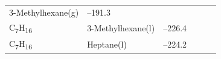 \documentclass[
]{book}
\theoremstyle{definition}
\theoremstyle{definition}
\theoremstyle{definition}
\theoremstyle{remark}
\begin{document}
\begin{longtable}[]{@{}llllll@{}}
\begin{minipage}[t]{0.17\columnwidth}
3-Methylhexane(g)\strut
\end{minipage} & \begin{minipage}[t]{0.15\columnwidth}\raggedright
--191.3\strut
\end{minipage} & \begin{minipage}[t]{0.15\columnwidth}\raggedright
\strut
\end{minipage} & \begin{minipage}[t]{0.14\columnwidth}\raggedright
\strut
\end{minipage} & \begin{minipage}[t]{0.14\columnwidth}\raggedright
\strut
\end{minipage}\tabularnewline
\begin{minipage}[t]{0.07\columnwidth}\raggedright
C\textsubscript{7}H\textsubscript{16}\strut
\end{minipage} & \begin{minipage}[t]{0.17\columnwidth}\raggedright
3-Methylhexane(l)\strut
\end{minipage} & \begin{minipage}[t]{0.15\columnwidth}\raggedright
--226.4\strut
\end{minipage} & \begin{minipage}[t]{0.15\columnwidth}\raggedright
\strut
\end{minipage} & \begin{minipage}[t]{0.14\columnwidth}\raggedright
\strut
\end{minipage} & \begin{minipage}[t]{0.14\columnwidth}\raggedright
\strut
\end{minipage}\tabularnewline
\begin{minipage}[t]{0.07\columnwidth}\raggedright
C\textsubscript{7}H\textsubscript{16}\strut
\end{minipage} & \begin{minipage}[t]{0.17\columnwidth}\raggedright
Heptane(l)\strut
\end{minipage} & \begin{minipage}[t]{0.15\columnwidth}\raggedright
--224.2\strut
\end{minipage} & \begin{minipage}[t]{0.15\columnwidth}\raggedright
\strut
\end{minipage} & \begin{minipage}[t]{0.14\columnwidth}\raggedright
\strut
\end{minipage} & \begin{minipage}[t]{0.14\columnwidth}\raggedright

\end{minipage}
\end{longtable}
\end{document}
